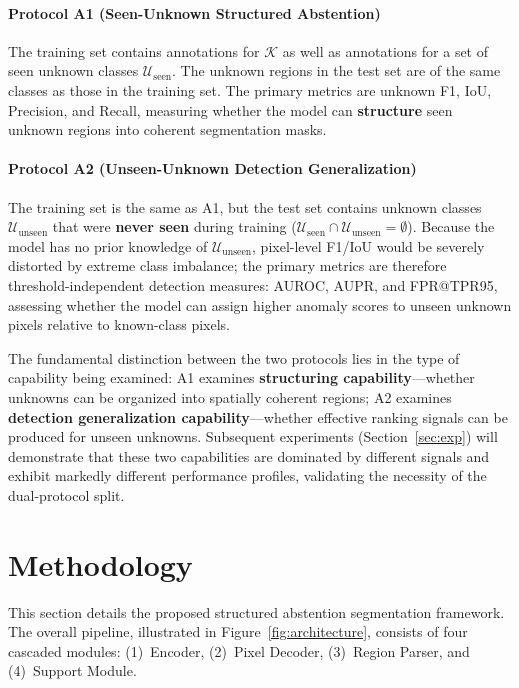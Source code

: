 \documentclass[3p,twocolumn,authoryear]{elsarticle}
\newcommand{\cK}{\mathcal{K}}                             %
\newcommand{\cU}{\mathcal{U}}                             %
\begin{document}
\paragraph{Protocol A1 (Seen-Unknown Structured Abstention)}
The training set contains annotations for $\cK$ as well as annotations for a set of
seen unknown classes $\cU_{\text{seen}}$.
The unknown regions in the test set are of the same classes as those in the training set.
The primary metrics are unknown F1, IoU, Precision, and Recall,
measuring whether the model can \textbf{structure} seen unknown regions into coherent
segmentation masks.

\paragraph{Protocol A2 (Unseen-Unknown Detection Generalization)}
The training set is the same as A1, but the test set contains unknown classes
$\cU_{\text{unseen}}$ that were \textbf{never seen} during training
($\cU_{\text{seen}} \cap \cU_{\text{unseen}} = \emptyset$).
Because the model has no prior knowledge of $\cU_{\text{unseen}}$,
pixel-level F1/IoU would be severely distorted by extreme class imbalance;
the primary metrics are therefore threshold-independent detection measures:
AUROC, AUPR, and FPR@TPR95, assessing whether the model can assign higher
anomaly scores to unseen unknown pixels relative to known-class pixels.

The fundamental distinction between the two protocols lies in the type of capability
being examined:
A1 examines \textbf{structuring capability}---whether unknowns can be organized into
spatially coherent regions;
A2 examines \textbf{detection generalization capability}---whether effective ranking
signals can be produced for unseen unknowns.
Subsequent experiments (Section~\ref{sec:exp}) will demonstrate that these two
capabilities are dominated by different signals and exhibit markedly different
performance profiles, validating the necessity of the dual-protocol split.


\section{Methodology}\label{sec:method}

This section details the proposed structured abstention segmentation framework.
The overall pipeline, illustrated in Figure~\ref{fig:architecture},
consists of four cascaded modules:
(1)~Encoder,
(2)~Pixel Decoder,
(3)~Region Parser, and
(4)~Support Module.
\end{document}
